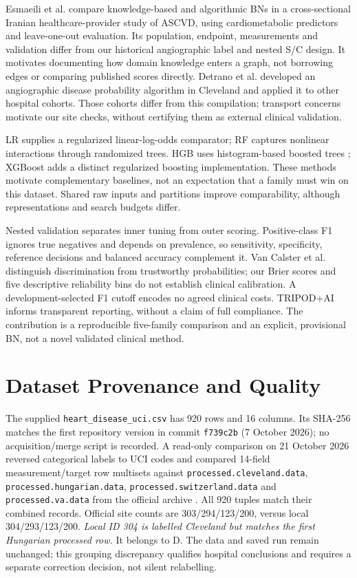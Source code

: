 \documentclass[conference]{IEEEtran}
\begin{document}
Esmaeili et al. \cite{azar} compare knowledge-based and algorithmic BNs in a cross-sectional Iranian healthcare-provider study of ASCVD, using cardiometabolic predictors and leave-one-out evaluation. Its population, endpoint, measurements and validation differ from our historical angiographic label and nested S/C design. It motivates documenting how domain knowledge enters a graph, not borrowing edges or comparing published scores directly. Detrano et al. \cite{detrano} developed an angiographic disease probability algorithm in Cleveland and applied it to other hospital cohorts. Those cohorts differ from this compilation; transport concerns motivate our site checks, without certifying them as external clinical validation.

LR supplies a regularized linear-log-odds comparator; RF \cite{breiman} captures nonlinear interactions through randomized trees. HGB uses histogram-based boosted trees \cite{ensemble}; XGBoost \cite{xgboost} adds a distinct regularized boosting implementation. These methods motivate complementary baselines, not an expectation that a family must win on this dataset. Shared raw inputs and partitions improve comparability, although representations and search budgets differ.

Nested validation \cite{nested} separates inner tuning from outer scoring. Positive-class F1 ignores true negatives and depends on prevalence, so sensitivity, specificity, reference decisions and balanced accuracy complement it. Van Calster et al. \cite{calibration} distinguish discrimination from trustworthy probabilities; our Brier scores and five descriptive reliability bins do not establish clinical calibration. A development-selected F1 cutoff encodes no agreed clinical costs. TRIPOD+AI \cite{tripod} informs transparent reporting, without a claim of full compliance. The contribution is a reproducible five-family comparison and an explicit, provisional BN, not a novel validated clinical method.

\section{Dataset Provenance and Quality}
The supplied \texttt{heart\_disease\_uci.csv} has 920 rows and 16 columns. Its SHA-256 matches the first repository version in commit \texttt{f739c2b} (7 October 2026); no acquisition/merge script is recorded. A read-only comparison on 21 October 2026 reversed categorical labels to UCI codes and compared 14-field measurement/target row multisets against \texttt{processed.cleveland.data}, \texttt{processed.hungarian.data}, \texttt{processed.switzerland.data} and \texttt{processed.va.data} from the official archive \cite{uci}. All 920 tuples match their combined records. Official site counts are 303/294/123/200, versus local 304/293/123/200. \emph{Local ID 304 is labelled Cleveland but matches the first Hungarian processed row.} It belongs to D. The data and saved run remain unchanged; this grouping discrepancy qualifies hospital conclusions and requires a separate correction decision, not silent relabelling.
\end{document}
